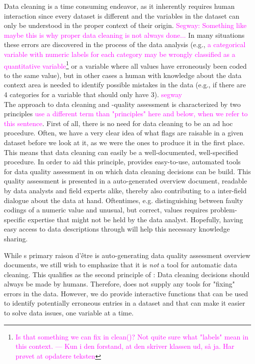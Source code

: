 \documentclass[article]{jss}
\newcommand{\hl}[1]{\textcolor{magenta}{#1}}
\newcommand{\R}[1]{\code{#1}}
\begin{document}
Data cleaning is a time consuming endeavor, as it inherently requires
human interaction since every dataset is different and the variables
in the dataset can only be understood in the proper context of their
origin.  \hl{Segway: Something like maybe this is why proper data
  cleaning is not always done...}  In many situations these errors are
discovered in the process of the data analysis (e.g., \hl{a
  categorical variable with numeric labels for each category may be 
  wrongly classified as a quantitative variable\footnote{\hl{Is that
      something we can fix in clean()? Not quite sure what "labels"
      mean in this context. --- Kun i den forstand, at den skriver
      klassen ud, så ja. Har prøvet at opdatere teksten}}} or a
variable where all values have erroneously been coded to the same
value), but in other cases a human with knowledge about the data
context area is needed to identify possible mistakes in the data
(e.g., if there are 4 categories for a
variable that should only have 3).  \hl{segway} \\



The  approach to data cleaning and -quality assessment is characterized by two principles \hl{use a different term than "principles" here and below, when we refer to this sentence}. First of all, there is no need for data cleaning to be an ad hoc procedure. Often, we have a very clear idea of what flags are raisable in a given dataset before we look at it, as we were the ones to produce it in the first place. This means that data cleaning can easily be a well-documented, well-specified procedure. In order to aid this principle,  provides easy-to-use, automated tools for data quality assessment in \R{R} on which data cleaning decisions can be build. This quality assessment is presented in a auto-generated overview document, readable by data analysts and field experts alike, thereby also contributing to a inter-field dialogue about the data at hand. Oftentimes, e.g. distinguishing between faulty codings of a numeric value and unusual, but correct, values requires problem-specific expertise that might not be held by the data analyst. Hopefully, having easy access to data descriptions through  will help this necessary knowledge sharing. 

While s primary raison d'être is auto-generating data quality assessment overview documents, we still wish to emphasize that it is \textit{not} a tool for automatic data cleaning. This qualifies as the second principle of : Data cleaning decisions should always be made by humans. Therefore,  does not supply any tools for "fixing" errors in the data. However, we do provide interactive functions that can be used to identify potentially erroneous entries in a dataset and that can make it easier to solve data issues, one variable at a time.\\
\end{document}
